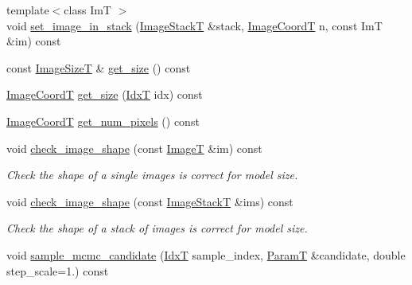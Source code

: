\begin{DoxyCompactItemize}
\item 
{\footnotesize template$<$class ImT $>$ }\\void \hyperlink{classmappel_1_1ImageFormat2DBase_aaae78a9b02452eb3538af34fcdcc3ad2}{set\+\_\+image\+\_\+in\+\_\+stack} (\hyperlink{classmappel_1_1ImageFormat2DBase_a8f0276e94ff242fa4740a718642f5e14}{Image\+StackT} \&stack, \hyperlink{classmappel_1_1ImageFormat2DBase_a45e9234d63c357f34ca56c72c12b9e9c}{Image\+CoordT} n, const ImT \&im) const 
\item 
const \hyperlink{classmappel_1_1ImageFormat2DBase_a49cccf61eb2a768a202634d27fcd81d5}{Image\+SizeT} \& \hyperlink{classmappel_1_1ImageFormat2DBase_a4497fe096f82ccb3af3c3632921081a5}{get\+\_\+size} () const 
\item 
\hyperlink{classmappel_1_1ImageFormat2DBase_a45e9234d63c357f34ca56c72c12b9e9c}{Image\+CoordT} \hyperlink{classmappel_1_1ImageFormat2DBase_a07ad97af7e697240ee359ae6a4821a2f}{get\+\_\+size} (\hyperlink{namespacemappel_ab17ec0f30b61ece292439d7ece81d3a8}{IdxT} idx) const 
\item 
\hyperlink{classmappel_1_1ImageFormat2DBase_a45e9234d63c357f34ca56c72c12b9e9c}{Image\+CoordT} \hyperlink{classmappel_1_1ImageFormat2DBase_a4f9e0d332462ff53678c03700666a564}{get\+\_\+num\+\_\+pixels} () const 
\item 
void \hyperlink{classmappel_1_1ImageFormat2DBase_aa5f3936c1c0b250fa1df17d53161a991}{check\+\_\+image\+\_\+shape} (const \hyperlink{classmappel_1_1ImageFormat2DBase_a667ea5016648958e507e7db8eaa041b0}{ImageT} \&im) const 
\begin{DoxyCompactList}\small\item\em Check the shape of a single images is correct for model size. \end{DoxyCompactList}\item 
void \hyperlink{classmappel_1_1ImageFormat2DBase_ab40faca8bf94a6e59765da5c3185c19b}{check\+\_\+image\+\_\+shape} (const \hyperlink{classmappel_1_1ImageFormat2DBase_a8f0276e94ff242fa4740a718642f5e14}{Image\+StackT} \&ims) const 
\begin{DoxyCompactList}\small\item\em Check the shape of a stack of images is correct for model size. \end{DoxyCompactList}\item 
void \hyperlink{classmappel_1_1MCMCAdaptor2D_a3992f7e939ff1a25c32250a1c097f654}{sample\+\_\+mcmc\+\_\+candidate} (\hyperlink{namespacemappel_ab17ec0f30b61ece292439d7ece81d3a8}{IdxT} sample\+\_\+index, \hyperlink{classmappel_1_1PointEmitterModel_a665ec6aea3aac139bb69a23c06d4b9a1}{ParamT} \&candidate, double step\+\_\+scale=1.) const 

\end{DoxyCompactItemize}
